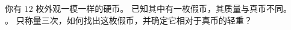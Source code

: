 
\begin{problem}
  你有 $12$ 枚外观一模一样的硬币。
  已知其中有一枚假币，其质量与真币不同。\\
  。
  只称量三次，如何找出这枚假币，并确定它相对于真币的轻重？

\end{problem}

\begin{solution}%
\end{solution}
